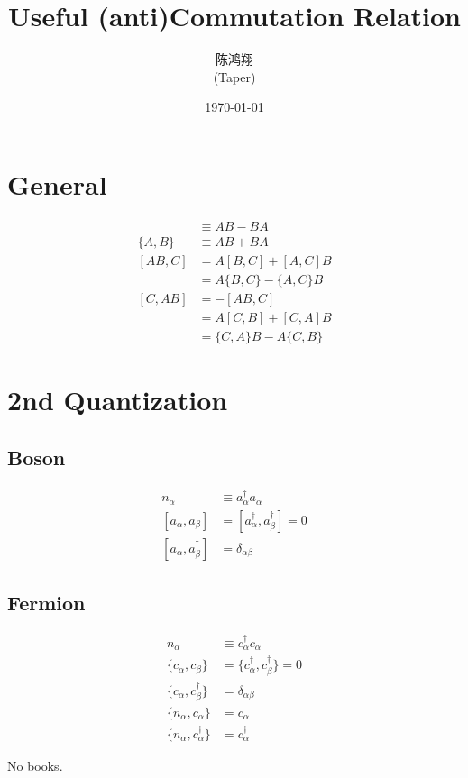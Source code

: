 \documentclass{article}
\title{Useful (anti)Commutation Relation}
\date{\today}
\author{\begin{CJK}{UTF8}{gbsn}
陈鸿翔
\end{CJK}(Taper)}
\numberwithin{equation}{subsection} %
\begin{document}
\maketitle


\tableofcontents

\section{General}
\begin{align}
    [A,B]   & \equiv AB-BA \\
    \{A,B\} & \equiv AB+BA\\
    [AB,C]  & = A [B,C] + [A,C]B\\
    	    & = A\{B,C\} - \{A,C\} B\\
    [C,AB]  & = -[AB,C]\\
		    & =A [C,B] + [C,A]B \\
            & =\{C,A\} B - A\{C,B\}
\end{align}

\section{2nd Quantization}

\subsection{Boson}

\begin{align}
    n_{\alpha} &\equiv a_{\alpha}^{\dagger}a_{\alpha}\\
    [a_{\alpha},a_{\beta}]&=[a^{\dagger}_{\alpha},a^{\dagger}_{\beta}]=0\\
    [a_{\alpha},a^{\dagger}_{\beta}]&=\delta_{\alpha\beta}
\end{align}

\subsection{Fermion}
\begin{align}
    n_{\alpha} &\equiv c_{\alpha}^{\dagger}c_{\alpha}\\
    \{c_{\alpha},c_{\beta}\} &= \{c_{\alpha}^{\dagger},c_{\beta}^{\dagger}\} = 0\\
    \{c_{\alpha},c^{\dagger}_{\beta}\}&=\delta_{\alpha\beta} \\
    \{n_{\alpha},c_{\alpha}\} &= c_{\alpha} \\
    \{n_{\alpha},c^{\dagger}_{\alpha}\} &= c^{\dagger}_{\alpha}
\end{align}

\begin{thebibliography}{1}
     No books.
\end{thebibliography}
\end{document}
